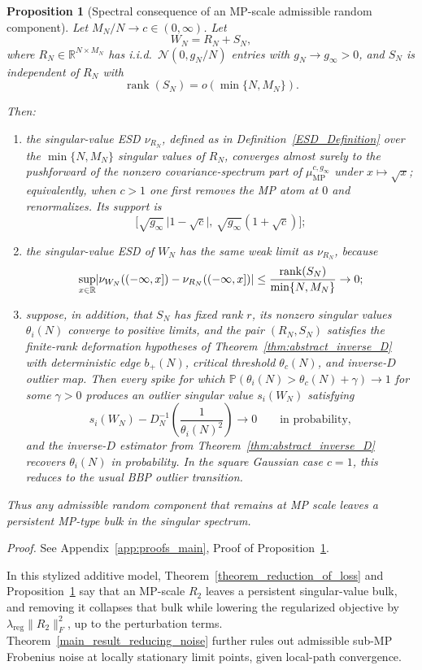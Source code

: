 \documentclass[11pt]{article}
\theoremstyle{plain}
\newtheorem{prop}[thm]{Proposition}
\theoremstyle{definition}
\theoremstyle{remark}
\DeclarePairedDelimiter{\abs}{\lvert}{\rvert}
\newcommand{\R}{\mathbb{R}}
\newcommand{\PP}{\mathbb{P}}
\newcommand{\rank}{\operatorname{rank}}
\newcommand{\1}{\mathbf{1}}
\newcommand{\proofloc}[1]{\par\noindent\emph{Proof.} #1\par}
\begin{document}
\begin{prop}[Spectral consequence of an MP-scale admissible random component]
\label{prop:mp_bulk_interpretation}
Let \(M_N/N\to c\in(0,\infty)\). Let
\[
W_N=R_N+S_N,
\]
where \(R_N\in\R^{N\times M_N}\) has i.i.d.\ \( \mathcal N(0,g_N/N)\) entries with \(g_N\to g_\infty>0\), and \(S_N\) is independent of \(R_N\) with
\[
\rank(S_N)=o(\min\{N,M_N\}).
\]

Then:
\begin{enumerate}[leftmargin=2em]
\item the singular-value ESD \(\nu_{R_N}\), defined as in Definition~\ref{ESD_Definition} over the \(\min\{N,M_N\}\) singular values of \(R_N\), converges almost surely to the pushforward of the \emph{nonzero covariance-spectrum part} of \(\mu_{\mathrm{MP}}^{c,g_\infty}\) under \(x\mapsto \sqrt{x}\); equivalently, when \(c>1\) one first removes the MP atom at \(0\) and renormalizes. Its support is
\[
\Big[\sqrt{g_\infty}\,\big|1-\sqrt c\big|,\,\sqrt{g_\infty}(1+\sqrt c)\Big];
\]
\item the singular-value ESD of \(W_N\) has the same weak limit as \(\nu_{R_N}\), because
\[
\sup_{x\in\R}
\abs{
\nu_{W_N}((-\infty,x])-\nu_{R_N}((-\infty,x])
}
\le
\frac{\rank(S_N)}{\min\{N,M_N\}}
\to0;
\]
\item suppose, in addition, that \(S_N\) has fixed rank \(r\), its nonzero singular values \(\theta_i(N)\) converge to positive limits, and the pair \((R_N,S_N)\) satisfies the finite-rank deformation hypotheses of Theorem~\ref{thm:abstract_inverse_D} with deterministic edge \(b_+(N)\), critical threshold \(\theta_c(N)\), and inverse-\(D\) outlier map. Then every spike for which \(\PP(\theta_i(N)>\theta_c(N)+\gamma)\to1\) for some \(\gamma>0\) produces an outlier singular value \(s_i(W_N)\) satisfying
\[
s_i(W_N)-D_N^{-1}\!\left(\frac1{\theta_i(N)^2}\right)\to0
\qquad\text{in probability},
\]
and the inverse-\(D\) estimator from Theorem~\ref{thm:abstract_inverse_D} recovers \(\theta_i(N)\) in probability. In the square Gaussian case \(c=1\), this reduces to the usual BBP outlier transition.
\end{enumerate}
Thus any admissible random component that remains at MP scale leaves a persistent MP-type bulk in the singular spectrum.
\end{prop}
\proofloc{See Appendix~\ref{app:proofs_main}, Proof of Proposition~\ref{prop:mp_bulk_interpretation}.}

In this stylized additive model, Theorem~\ref{theorem_reduction_of_loss} and Proposition~\ref{prop:mp_bulk_interpretation} say that an MP-scale \(R_2\) leaves a persistent singular-value bulk, and removing it collapses that bulk while lowering the regularized objective by \(\lambda_{\mathrm{reg}}\|R_2\|_F^2\), up to the perturbation terms. Theorem~\ref{main_result_reducing_noise} further rules out admissible sub-MP Frobenius noise at locally stationary limit points, given local-path convergence.
\end{document}
